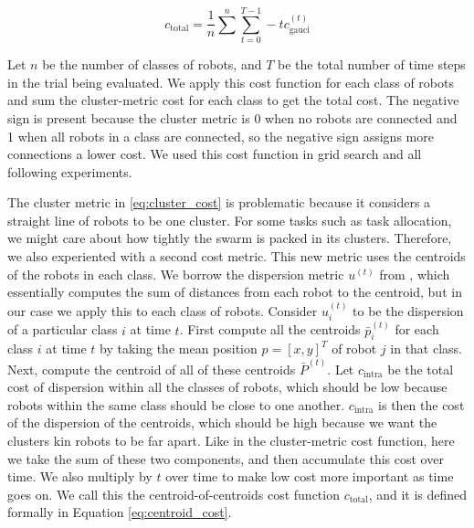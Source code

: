 \documentclass[conference]{IEEEtran}
\begin{document}
    \begin{equation} \label{eq:cluster_cost}
      c_{\text{total}} =  \frac{1}{n}\sum^n\sum_{t=0}^{T-1} -t c_{\text{gauci}}^{(t)}
    \end{equation}

    Let $n$ be the number of classes of robots, and $T$ be the total number of time steps in the trial being evaluated. We apply this cost function for each class of robots and sum the cluster-metric cost for each class to get the total cost. The negative sign is present because the cluster metric is 0 when no robots are connected and 1 when all robots in a class are connected, so the negative sign assigns more connections a lower cost. We used this cost function in grid search and all following experiments.

    The cluster metric in \eqref{eq:cluster_cost} is problematic because it considers a straight line of robots to be one cluster. For some tasks such as task allocation, we might care about how tightly the swarm is packed in its clusters. Therefore, we also experiented with a second cost metric. This new metric uses the centroids of the robots in each class. We borrow the dispersion metric $u^{(t)}$ from \cite{gauci_self-organized_2014}, which essentially computes the sum of distances from each robot to the centroid, but in our case we apply this to each class of robots. Consider $u_i^{(t)}$ to be the dispersion of a particular class $i$ at time $t$. First compute all the centroids $\bar{p}_i^{(t)}$ for each class $i$ at time $t$ by taking the mean position $p=[x,y]^{T}$ of robot $j$ in that class. Next, compute the centroid of all of these centroids $\bar{P}^{(t)}$. Let $c_{\text{intra}}$ be the total cost of dispersion within all the classes of robots, which should be low because robots within the same class should be close to one another. $c_{\text{intra}}$ is then the cost of the dispersion of the centroids, which should be high because we want the clusters kin robots to be far apart. Like in the cluster-metric cost function, here we take the sum of these two components, and then accumulate this cost over time. We also multiply by $t$ over time to make low cost more important as time goes on. We call this the centroid-of-centroids cost function $c_{\text{total}}$, and it is defined formally in Equation \eqref{eq:centroid_cost}.
\end{document}
